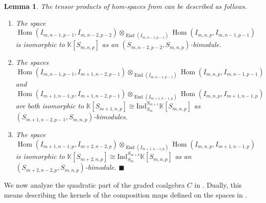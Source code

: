 \documentclass[11pt]{article}
\theoremstyle{plain}
\newtheorem{lemma}{Lemma}[section]
\theoremstyle{nonumberplain}
\theoremstyle{plain}
\theoremstyle{nonumberplain}
\newcommand\bK{{\mathbb K}}
\DeclareMathOperator{\End}{\mathrm{End}}
\DeclareMathOperator{\Hom}{\mathrm{Hom}}
\newcommand{\qedhere}{\mbox{}\hfill\ensuremath{\blacksquare}}
\begin{document}
\begin{lemma}\label{le.11}
  The tensor products of hom-spaces from  can be described as follows. 
  \begin{enumerate}
     \renewcommand{\labelenumi}{(\alph{enumi})}
      \item The space  
        \begin{equation}\label{eq.11a}
          \Hom(I_{m,n-1,p-1},I_{m,n-2,p-2})\otimes_{\End(I_{m,n-1,p-1})}\Hom(I_{m,n,p},I_{m,n-1,p-1})
        \end{equation}
        is isomorphic to $\bK[S_{m,n,p}]$ as an $(S_{m,n-2,p-2},S_{m,n,p})$-bimodule. 
      \item The spaces  
        \begin{equation}\label{eq.11b}
          \Hom(I_{m,n-1,p-1},I_{m+1,n-2,p-1})\otimes_{\End(I_{m,n-1,p-1})}\Hom(I_{m,n,p},I_{m,n-1,p-1})
        \end{equation}
        and
        \begin{equation}\label{eq.11c}
          \Hom(I_{m+1,n-1,p},I_{m+1,n-2,p-1})\otimes_{\End(I_{m+1,n-1,p})}\Hom(I_{m,n,p},I_{m+1,n-1,p})
        \end{equation}
        are both isomorphic to $\bK[S_{m+1,n,p}]\cong \mathrm{Ind}_{S_m}^{S_{m+1}}\bK[S_{m,n,p}]$ as $(S_{m+1,n-2,p-1},S_{m,n,p})$-bimodules. 
      \item The space  
        \begin{equation}\label{eq.11d}
          \Hom(I_{m+1,n-1,p},I_{m+2,n-2,p})\otimes_{\End(I_{m+1,n-1,p})}\Hom(I_{m,n,p},I_{m+1,n-1,p})
        \end{equation}
        is isomorphic to $\bK[S_{m+2,n,p}]\cong \mathrm{Ind}_{S_m}^{S_{m+2}}\bK[S_{m,n,p}]$ as an $(S_{m+2,n-2,p},S_{m,n,p})$-bimodule. \qedhere 
   \end{enumerate}
\end{lemma}



We now analyze the quadratic part of the graded coalgebra $C$ in . Dually, this means describing the kernels of the composition maps defined on the spaces in .  
\end{document}
